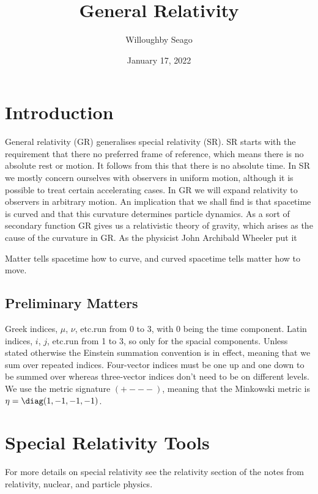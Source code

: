 \documentclass[fleqn]{NotesClass}
\title{General Relativity}
\author{Willoughby Seago}
\date{January 17, 2022}
\begin{document}
    \frontmatter
    \titlepage
    \tableofcontents
    \listoffigures
    \mainmatter
    \chapter{Introduction}
    General relativity (GR) generalises special relativity (SR).
    SR starts with the requirement that there no preferred frame of reference, which means there is no absolute rest or motion.
    It follows from this that there is no absolute time.
    In SR we mostly concern ourselves with observers in uniform motion, although it is possible to treat certain accelerating cases.
    In GR we will expand relativity to observers in arbitrary motion.
    An implication that we shall find is that spacetime is curved and that this curvature determines particle dynamics.
    As a sort of secondary function GR gives us a relativistic theory of gravity, which arises as the cause of the curvature in GR.
    As the physicist John Archibald Wheeler put it
    \begin{displayquote}
        Matter tells spacetime how to curve, and curved spacetime tells matter how to move.
    \end{displayquote}

    \section{Preliminary Matters}
    Greek indices, \(\mu\), \(\nu\), etc.\@ run from 0 to 3, with 0 being the time component.
    Latin indices, \(i\), \(j\), etc.\@ run from 1 to 3, so only for the spacial components.
    Unless stated otherwise the Einstein summation convention is in effect, meaning that we sum over repeated indices.
    Four-vector indices must be one up and one down to be summed over whereas three-vector indices don't need to be on different levels.
    We use the metric signature \(({+}{-}{-}{-})\), meaning that the Minkowski metric is \(\eta = \diag(1, -1, -1, -1)\).
    
    \chapter{Special Relativity Tools}
    \begin{rmk}
        For more details on special relativity see the relativity section of the notes from relativity, nuclear, and particle physics.
    \end{rmk}
\end{document}
